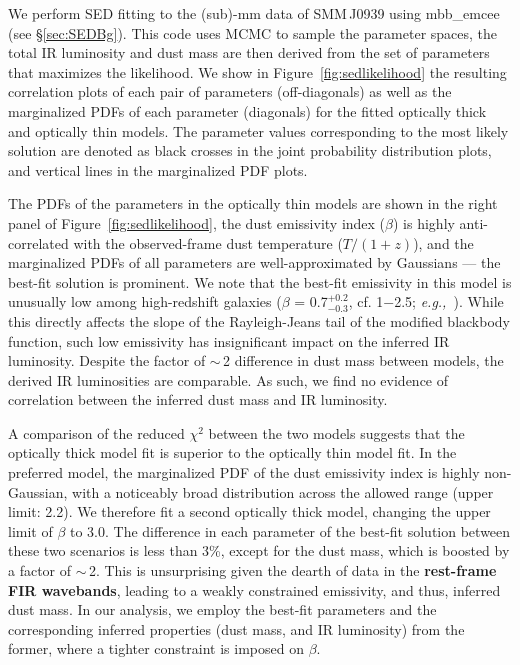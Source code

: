 \documentclass[iop, revtex4]{emulateapj}
\newcommand{\eg}{{\sl e.g.,~}}
\begin{document}
\clearpage
\begin{turnpage}

\clearpage
\end{turnpage}


\appendix
We perform SED fitting to the (sub)-mm data of SMM\,J0939 using {\sc mbb\_emcee} (see \S \ref{sec:SEDBg}). This code uses MCMC to sample the parameter spaces, the total IR luminosity and dust mass are then derived from the set of parameters that maximizes the likelihood.
We show in Figure~\ref{fig:sedlikelihood} the resulting correlation plots of each pair of parameters (off-diagonals) as well as the marginalized PDFs of each parameter (diagonals) for the fitted optically thick and optically thin models.
The parameter values corresponding to the most likely solution are denoted as black crosses in the joint probability distribution plots, and vertical lines in the marginalized PDF plots. \par

The PDFs of the parameters in the optically thin models are shown in the right panel of Figure~\ref{fig:sedlikelihood}, the dust emissivity index ($\beta$) is highly anti-correlated with the observed-frame dust temperature ($T/(1+z)$), and the marginalized PDFs of all parameters are well-approximated by Gaussians --- the best-fit solution is prominent.
We note that the best-fit emissivity in this model is unusually low among high-redshift galaxies ($\beta$ = 0.7$^{+0.2}_{-0.3}$, cf. 1$-$2.5; \eg \citealt[][and references therein]{Casey12a}). While this directly affects the slope of the Rayleigh-Jeans tail of the modified blackbody function, such low emissivity has insignificant impact on the inferred IR luminosity.
Despite the factor of $\sim$\,2 difference
in dust mass
between models, the derived IR luminosities are comparable. As such, we find no evidence of correlation between the inferred dust mass and IR luminosity. 

A comparison of the reduced $\chi^2$ between the two models suggests that the optically thick model fit is superior to the optically thin model fit. In the preferred model, the marginalized PDF of the dust emissivity index is highly non-Gaussian, with a noticeably broad distribution across
the allowed range (upper limit: 2.2). We therefore fit a second optically thick model, changing the upper limit of $\beta$ to 3.0. The difference in each
parameter of the best-fit solution between these two scenarios is less than 3\%, except for the dust mass, which is boosted by a factor of $\sim$\,2. This is
unsurprising given the dearth of data in the {\bf rest-frame FIR wavebands}, leading to a weakly constrained emissivity, and thus, inferred dust mass.
In our analysis, we employ the best-fit parameters and the corresponding inferred properties (dust mass, and IR luminosity) from the former, where a tighter constraint is imposed on $\beta$.
\end{document}
